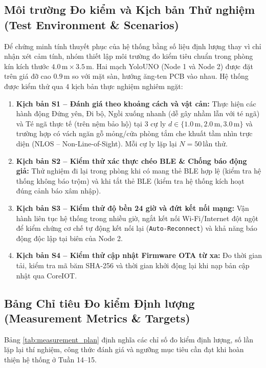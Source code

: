 \documentclass{hcmut-report}
\begin{document}
\subsection[Môi trường Đo kiểm và Kịch bản Thử nghiệm]{Môi trường Đo kiểm và Kịch bản Thử nghiệm (Test Environment \& Scenarios)}
Để chứng minh tính thuyết phục của hệ thống bằng số liệu định lượng thay vì chỉ nhận xét cảm tính, nhóm thiết lập môi trường đo kiểm tiêu chuẩn trong phòng kín kích thước $4.0\,\text{m} \times 3.5\,\text{m}$. Hai mạch YoloUNO (Node 1 và Node 2) được đặt trên giá đỡ cao $0.9\,\text{m}$ so với mặt sàn, hướng ăng-ten PCB vào nhau. Hệ thống được kiểm thử qua 4 kịch bản thực nghiệm nghiêm ngặt:
\begin{enumerate}
  \item \textbf{Kịch bản S1 -- Đánh giá theo khoảng cách và vật cản:} Thực hiện các hành động Đứng yên, Đi bộ, Ngồi xuống nhanh (dễ gây nhầm lẫn với té ngã) và Té ngã thực tế (trên nệm bảo hộ) tại 3 cự ly $d \in \{1.0\,\text{m}, 2.0\,\text{m}, 3.0\,\text{m}\}$ và trường hợp có vách ngăn gỗ mỏng/cửa phòng tắm che khuất tầm nhìn trực diện (NLOS -- Non-Line-of-Sight). Mỗi cự ly lặp lại $N = 50\,\text{lần thử}$.
  \item \textbf{Kịch bản S2 -- Kiểm thử xác thực chéo BLE \& Chống báo động giả:} Thử nghiệm đi lại trong phòng khi có mang thẻ BLE hợp lệ (kiểm tra hệ thống không báo trộm) và khi tắt thẻ BLE (kiểm tra hệ thống kích hoạt đúng cảnh báo xâm nhập).
  \item \textbf{Kịch bản S3 -- Kiểm thử độ bền 24 giờ và đứt kết nối mạng:} Vận hành liên tục hệ thống trong nhiều giờ, ngắt kết nối Wi-Fi/Internet đột ngột để kiểm chứng cơ chế tự động kết nối lại (\texttt{Auto-Reconnect}) và khả năng báo động độc lập tại biên của Node 2.
  \item \textbf{Kịch bản S4 -- Kiểm thử cập nhật Firmware OTA từ xa:} Đo thời gian tải, kiểm tra mã băm SHA-256 và thời gian khởi động lại khi nạp bản cập nhật qua CoreIOT.
\end{enumerate}

\subsection[Bảng Chỉ tiêu Đo kiểm Định lượng]{Bảng Chỉ tiêu Đo kiểm Định lượng (Measurement Metrics \& Targets)}
Bảng \ref{tab:measurement_plan} định nghĩa các chỉ số đo kiểm định lượng, số lần lặp lại thí nghiệm, công thức đánh giá và ngưỡng mục tiêu cần đạt khi hoàn thiện hệ thống ở Tuần 14--15.
\end{document}
